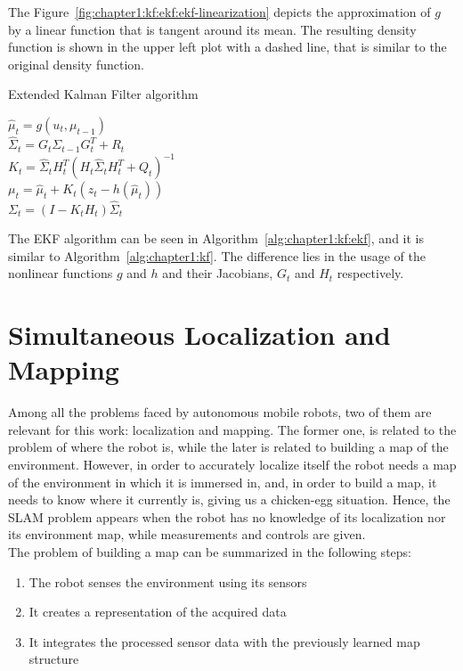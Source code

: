 The Figure~\ref{fig:chapter1:kf:ekf:ekf-linearization} depicts the approximation of $g$ by a linear function that is tangent around its mean. The resulting density function is shown in the upper left plot with a dashed line, that is similar to the original density function.\\

\begin{algorithm}[h]
    \caption{Extended Kalman Filter algorithm}
    \label{alg:chapter1:kf:ekf}

    \BlankLine
    \BlankLine
    $\hat\mu_t = g \left(u_t, \mu_{t-1}\right)$ \\
    $\hat\Sigma_t = G_t \Sigma_{t-1} G_t^T + R_t$ \\
    \BlankLine
    $K_t = \hat\Sigma_t H_t^T \left(H_t \hat\Sigma_t H_t^T + Q_t\right)^{-1}$ \\
    $\mu_t = \hat\mu_t + K_t \left(z_t - h \left(\hat\mu_t\right) \right) $ \\
    $\Sigma_t = (I - K_t H_t) \hat\Sigma_t$ \\
    \BlankLine
\end{algorithm}

The EKF algorithm can be seen in Algorithm~\ref{alg:chapter1:kf:ekf}, and it is similar to Algorithm~\ref{alg:chapter1:kf}. The difference lies in the usage of the nonlinear functions $g$ and $h$ and their Jacobians, $G_t$ and $H_t$ respectively.

\section{Simultaneous Localization and Mapping}
\label{sec:chapter1:slam}
Among all the problems faced by autonomous mobile robots, two of them are relevant for this work: localization and mapping. The former one, is related to the problem of where the robot is, while the later is related to building a map of the environment. However, in order to accurately localize itself the robot needs a map of the environment in which it is immersed in, and, in order to build a map, it needs to know where it currently is, giving us a chicken-egg situation. Hence, the \ac{SLAM} problem appears when the robot has no knowledge of its localization nor its environment map, while measurements and controls are given.\\

The problem of building a map can be summarized in the following steps:
\begin{enumerate}
    \item{The robot senses the environment using its sensors}
    \item{It creates a representation of the acquired data}
    \item{It integrates the processed sensor data with the previously learned map structure}
\end{enumerate}

